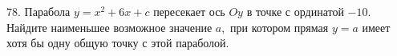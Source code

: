 78. Парабола $y=x^2+6x+c$ пересекает ось $Oy$ в точке с ординатой $-10.$ Найдите наименьшее возможное значение $a,$ при котором прямая $y=a$ имеет хотя бы одну общую точку с этой параболой.\\
